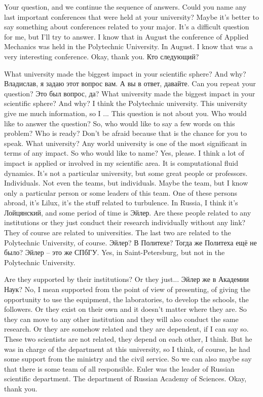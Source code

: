 \documentclass[main.tex]{subfiles}
\begin{document}
Your question, and we continue the sequence of answers.
Could you name any last important conferences that were held at your university?
Maybe it's better to say something about conferences related to your major.
It's a difficult question for me, but I'll try to answer.
I know that in August the conference of Applied Mechanics was held in the Polytechnic University.
In August.
I know that was a very interesting conference.
Okay, thank you.
Кто следующий?

What university made the biggest impact in your scientific sphere?
And why?
Владислав, я задаю этот вопрос вам.
А вы в ответ, давайте.
Can you repeat your question?
Это был вопрос, да?
What university made the biggest impact in your scientific sphere?
And why?
I think the Polytechnic university.
This university give me much information, so I ...
This question is not about you.
Who would like to answer the question?
So, who would like to say a few words on this problem?
Who is ready?
Don't be afraid because that is the chance for you to speak.
What university?
Any world university is one of the most significant in terms of any impact.
So who would like to name?
Yes, please.
I think a lot of impact is applied or involved in my scientific area.
It is computational fluid dynamics.
It's not a particular university, but some great people or professors.
Individuals.
Not even the teams, but individuals.
Maybe the team, but I know only a particular person or some leaders of this team.
One of these persons abroad, it's Lilux, it's the stuff related to turbulence.
In Russia, I think it's Лойцянский, and some period of time is Эйлер.
Are these people related to any institutions or they just conduct their research individually without any link?
They of course are related to universities.
The last two are related to the Polytechnic University, of course.
Эйлер?
В Политехе?
Тогда же Политеха ещё не было?
Эйлер -- это же СПбГУ.
Yes, in Saint-Petersburg, but not in the Polytechnic University.

Are they supported by their institutions?
Or they just...
Эйлер же в Академии Наук?
No, I mean supported from the point of view of presenting, of giving the opportunity to use the equipment, the laboratories, to develop the schools, the followers.
Or they exist on their own and it doesn't matter where they are.
So they can move to any other institution and they will also conduct the same research.
Or they are somehow related and they are dependent, if I can say so.
These two scientists are not related, they depend on each other, I think.
But he was in charge of the department at this university, so I think, of course, he had some support from the ministry and the civil service.
So we can also maybe say that there is some team of all responsible.
Euler was the leader of Russian scientific department.
The department of Russian Academy of Sciences.
Okay, thank you.
\end{document}
